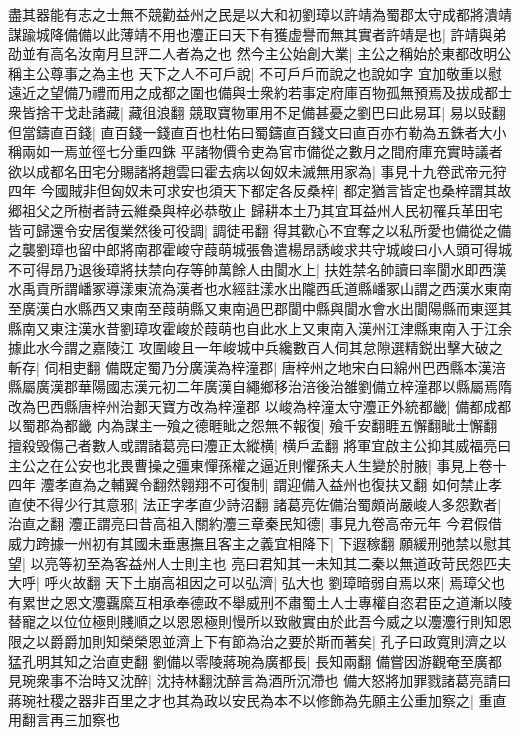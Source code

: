 盡其器能有志之士無不競勸益州之民是以大和初劉璋以許靖為蜀郡太守成都將潰靖謀踰城降備備以此薄靖不用也灋正曰天下有獲虚譽而無其實者許靖是也|{
	許靖與弟劭並有高名汝南月旦評二人者為之也}
然今主公始創大業|{
	主公之稱始於東都改明公稱主公尊事之為主也}
天下之人不可戶說|{
	不可戶戶而說之也說如字}
宜加敬重以慰遠近之望備乃禮而用之成都之圍也備與士衆約若事定府庫百物孤無預焉及拔成都士衆皆捨干戈赴諸藏|{
	藏徂浪翻}
競取寶物軍用不足備甚憂之劉巴曰此易耳|{
	易以䜴翻}
但當鑄直百錢|{
	直百錢一錢直百也杜佑曰蜀鑄直百錢文曰直百亦冇勒為五銖者大小稱兩如一焉並徑七分重四銖}
平諸物價令吏為官市備從之數月之間府庫充實時議者欲以成都名田宅分賜諸將趙雲曰霍去病以匈奴未滅無用家為|{
	事見十九卷武帝元狩四年}
今國賊非但匈奴未可求安也須天下都定各反桑梓|{
	都定猶言皆定也桑梓謂其故郷祖父之所樹者詩云維桑與梓必恭敬止}
歸耕本土乃其宜耳益州人民初罹兵革田宅皆可歸還令安居復業然後可役調|{
	調徒弔翻}
得其歡心不宜奪之以私所愛也備從之備之襲劉璋也留中郎將南郡霍峻守葭萌城張魯遣楊昂誘峻求共守城峻曰小人頭可得城不可得昂乃退後璋將扶禁向存等帥萬餘人由閬水上|{
	扶姓禁名帥讀曰率閬水即西漢水禹貢所謂嶓冢導漾東流為漢者也水經註漾水出隴西氐道縣嶓冢山謂之西漢水東南至廣漢白水縣西又東南至葭萌縣又東南過巴郡閬中縣與閬水會水出閬陽縣而東逕其縣南又東注漢水昔劉璋攻霍峻於葭萌也自此水上又東南入漢州江津縣東南入于江余據此水今謂之嘉陵江}
攻圍峻且一年峻城中兵纔數百人伺其怠隙選精鋭出擊大破之斬存|{
	伺相吏翻}
備既定蜀乃分廣漢為梓潼郡|{
	唐梓州之地宋白曰綿州巴西縣本漢涪縣屬廣漢郡華陽國志漢元初二年廣漢自繩鄉移治涪後治雒劉備立梓潼郡以縣屬焉隋改為巴西縣唐梓州治郪天寶方改為梓潼郡}
以峻為梓潼太守灋正外統都畿|{
	備都成都以蜀郡為都畿}
内為謀主一飱之德睚眦之怨無不報復|{
	飱千安翻睚五懈翻眦士懈翻}
擅殺毁傷己者數人或謂諸葛亮曰灋正太縱横|{
	横戶孟翻}
將軍宜啟主公抑其威福亮曰主公之在公安也北畏曹操之彊東憚孫權之逼近則懼孫夫人生變於肘腋|{
	事見上卷十四年}
灋孝直為之輔翼令翻然翱翔不可復制|{
	謂迎備入益州也復扶又翻}
如何禁止孝直使不得少行其意邪|{
	法正字孝直少詩沼翻}
諸葛亮佐備治蜀頗尚嚴峻人多怨歎者|{
	治直之翻}
灋正謂亮曰昔高祖入關約灋三章秦民知德|{
	事見九卷高帝元年}
今君假借威力跨據一州初有其國未垂惠撫且客主之義宜相降下|{
	下遐稼翻}
願緩刑弛禁以慰其望|{
	以亮等初至為客益州人士則主也}
亮曰君知其一未知其二秦以無道政苛民怨匹夫大呼|{
	呼火故翻}
天下土崩高祖因之可以弘濟|{
	弘大也}
劉璋暗弱自焉以來|{
	焉璋父也}
有累世之恩文灋覊縻互相承奉德政不舉威刑不肅蜀土人士專權自恣君臣之道漸以陵替寵之以位位極則賤順之以恩恩極則慢所以致敝實由於此吾今威之以灋灋行則知恩限之以爵爵加則知榮榮恩並濟上下有節為治之要於斯而著矣|{
	孔子曰政寬則濟之以猛孔明其知之治直吏翻}
劉備以零陵蔣琬為廣都長|{
	長知兩翻}
備嘗因游觀奄至廣都見琬衆事不治時又沈醉|{
	沈持林翻沈醉言為酒所沉滯也}
備大怒將加罪戮諸葛亮請曰蔣琬社稷之器非百里之才也其為政以安民為本不以修飾為先願主公重加察之|{
	重直用翻言再三加察也}
